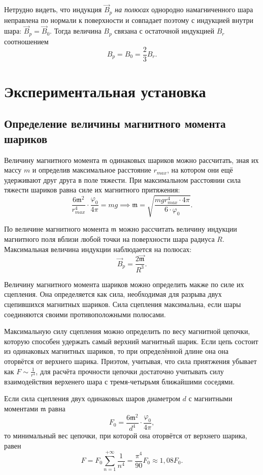 \documentclass[a4paper,12pt]{article}
\begin{document}
Нетрудно видеть, что индукция $\vec{B}_p$ \textit{на полюсах} однородно намагниченного шара неправлена по нормали к поверхности и совпадает поэтому с индукцией внутри шара: $\vec{B}_p=\vec{B}_0$. Тогда величина $B_p$ связана с остаточной индукцией $B_r$ соотношением\[B_p=B_0=\frac{2}{3}B_r.\]
\newpage
\section*{Экспериментальная установка}

\subsection*{Определение величины магнитного момента шариков}

Величину магнитного момента $\mathfrak{m}$ одинаковых шариков можно рассчитать, зная их массу $m$ и определив максимальное расстояние $r_{max}$, на котором они ещё удерживают друг друга в поле тяжести. При максимальном расстоянии сила тяжести шариков равна силе их магнитного притяжения:\[\frac{6\mathfrak{m}^2}{r_{max}^4}  \cdot \frac{\varphi_0}{4\pi} = mg\implies\mathfrak{m}=\sqrt{\frac{mgr_{max}^4 \cdot 4\pi}{6 \cdot \varphi_0}}.\]

По величине магнитного момента $\mathfrak{m}$ можно рассчитать величину индукции магнитного поля вблизи любой точки на поверхности шара радиуса $R$. Максимальная величина индукции наблюдается на полюсах:\[\vec{B}_p=\frac{2\vec{\mathfrak{m}}}{R^3}.\]

Величину магнитного момента шариков можно определить макже по силе их сцепления. Она определяется как сила, необходимая для разрыва двух сцепившихся магнитных шариков. Сила сцепления максимальна, если шары соединяются своими противоположными полюсами.

Максимальную силу сцепления можно определить по весу магнитной цепочки, которую способен удержать самый верхний магнитный шарик. Если цепь состоит из одинаковых магнитных шариков, то при определённой длине она она оторвётся от верхнего шарика. Приэтом, учитывая, что сила приятжения убывает как $F\sim\frac{1}{r^4}$, для расчёта прочности цепочки достаточно учитывать силу взаимодействия верхенего шара с тремя-четырьмя ближайшими соседями.

Если сила сцепления двух одинаковых шаров диаметром $d$ с магнитными моментами $\mathfrak{m}$ равна\[F_0=\frac{6\mathfrak{m}^2}{d^4}  \cdot \frac{\varphi_0}{4\pi} ,\]то минимальный вес цепочки, при которой она оторвётся от верхнего шарика, равен\[F=F_0\sum_{n=1}^{+\infty}\frac{1}{n^4}=\frac{\pi^4}{90}F_0\approx1,08F_0.\]
\end{document}
